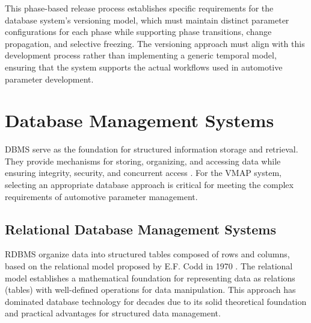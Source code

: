This phase-based release process establishes specific requirements for the database system's versioning model, which must maintain distinct parameter configurations for each phase while supporting phase transitions, change propagation, and selective freezing. The versioning approach must align with this development process rather than implementing a generic temporal model, ensuring that the system supports the actual workflows used in automotive parameter development.

\section{Database Management Systems}
\label{sec}

\ac{DBMS} serve as the foundation for structured information storage and retrieval. They provide mechanisms for storing, organizing, and accessing data while ensuring integrity, security, and concurrent access \cite{elmasri2015fundamentals}. For the \ac{VMAP} system, selecting an appropriate database approach is critical for meeting the complex requirements of automotive parameter management.

\subsection{Relational Database Management Systems}
\label{subsec:relational-database-management-systems}

\ac{RDBMS} organize data into structured tables composed of rows and columns, based on the relational model proposed by E.F. Codd in 1970 \cite{codd1970relational}. The relational model establishes a mathematical foundation for representing data as relations (tables) with well-defined operations for data manipulation. This approach has dominated database technology for decades due to its solid theoretical foundation and practical advantages for structured data management.

